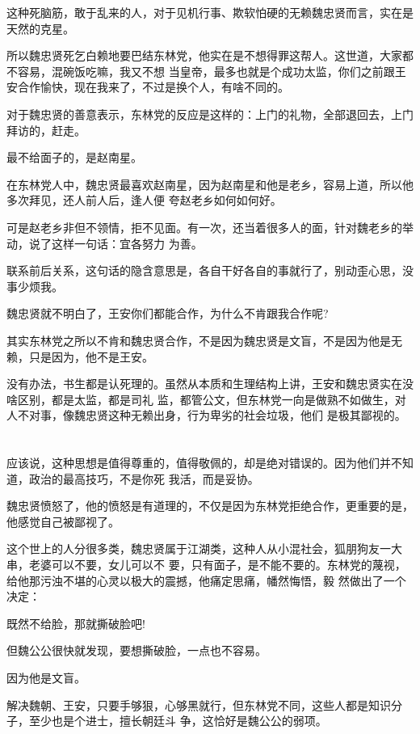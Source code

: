 \documentclass[11pt,a4paper,onecolumn]{article}
\begin{document}
这种死脑筋，敢于乱来的人，对于见机行事、欺软怕硬的无赖魏忠贤而言，实在是天然的克星。

所以魏忠贤死乞白赖地要巴结东林党，他实在是不想得罪这帮人。这世道，大家都不容易，混碗饭吃嘛，我又不想
当皇帝，最多也就是个成功太监，你们之前跟王安合作愉快，现在我来了，不过是换个人，有啥不同的。

对于魏忠贤的善意表示，东林党的反应是这样的：上门的礼物，全部退回去，上门拜访的，赶走。

最不给面子的，是赵南星。

在东林党人中，魏忠贤最喜欢赵南星，因为赵南星和他是老乡，容易上道，所以他多次拜见，还人前人后，逢人便
夸赵老乡如何如何好。

可是赵老乡非但不领情，拒不见面。有一次，还当着很多人的面，针对魏老乡的举动，说了这样一句话：宜各努力
为善。

联系前后关系，这句话的隐含意思是，各自干好各自的事就行了，别动歪心思，没事少烦我。

魏忠贤就不明白了，王安你们都能合作，为什么不肯跟我合作呢?

其实东林党之所以不肯和魏忠贤合作，不是因为魏忠贤是文盲，不是因为他是无赖，只是因为，他不是王安。

没有办法，书生都是认死理的。虽然从本质和生理结构上讲，王安和魏忠贤实在没啥区别，都是太监，都是司礼
监，都管公文，但东林党一向是做熟不如做生，对人不对事，像魏忠贤这种无赖出身，行为卑劣的社会垃圾，他们
是极其鄙视的。

\section[\thesection]{}

应该说，这种思想是值得尊重的，值得敬佩的，却是绝对错误的。因为他们并不知道，政治的最高技巧，不是你死
我活，而是妥协。

魏忠贤愤怒了，他的愤怒是有道理的，不仅是因为东林党拒绝合作，更重要的是，他感觉自己被鄙视了。

这个世上的人分很多类，魏忠贤属于江湖类，这种人从小混社会，狐朋狗友一大串，老婆可以不要，女儿可以不
要，只有面子，是不能不要的。东林党的蔑视，给他那污浊不堪的心灵以极大的震撼，他痛定思痛，幡然悔悟，毅
然做出了一个决定：

既然不给脸，那就撕破脸吧!

但魏公公很快就发现，要想撕破脸，一点也不容易。

因为他是文盲。

解决魏朝、王安，只要手够狠，心够黑就行，但东林党不同，这些人都是知识分子，至少也是个进士，擅长朝廷斗
争，这恰好是魏公公的弱项。
\end{document}
